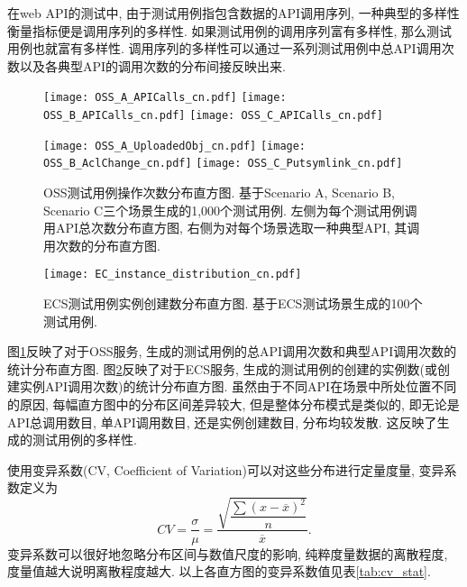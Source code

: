             在web API的测试中, 由于测试用例指包含数据的API调用序列, 一种典型的多样性衡量指标便是调用序列的多样性. 如果测试用例的调用序列富有多样性, 那么测试用例也就富有多样性. 调用序列的多样性可以通过一系列测试用例中总API调用次数以及各典型API的调用次数的分布间接反映出来.
            
            \begin{figure}[!htb]
                \begin{minipage}{0.5\textwidth}
                    \centering
                    \texttt{[image: OSS\_A\_APICalls\_cn.pdf]}
                    \texttt{[image: OSS\_B\_APICalls\_cn.pdf]}
                    \texttt{[image: OSS\_C\_APICalls\_cn.pdf]}
                \end{minipage}
                \begin{minipage}{0.5\textwidth}
                    \centering
                    \texttt{[image: OSS\_A\_UploadedObj\_cn.pdf]}
                    \texttt{[image: OSS\_B\_AclChange\_cn.pdf]}
                    \texttt{[image: OSS\_C\_Putsymlink\_cn.pdf]}
                \end{minipage}
                \caption{OSS测试用例操作次数分布直方图. 基于Scenario A, Scenario B, Scenario C三个场景生成的1,000个测试用例. 左侧为每个测试用例调用API总次数分布直方图, 右侧为对每个场景选取一种典型API, 其调用次数的分布直方图.}
                \label{fig:OSS_stat}
            \end{figure}
            
            \begin{figure}[!htb]
                \centering
                \texttt{[image: EC\_instance\_distribution\_cn.pdf]}
                \caption{ECS测试用例实例创建数分布直方图. 基于ECS测试场景生成的100个测试用例.}
                \label{fig:ECS_stat}
            \end{figure}
            
            图\ref{fig:OSS_stat}反映了对于OSS服务, 生成的测试用例的总API调用次数和典型API调用次数的统计分布直方图. 图\ref{fig:ECS_stat}反映了对于ECS服务, 生成的测试用例的创建的实例数(或创建实例API调用次数)的统计分布直方图. 虽然由于不同API在场景中所处位置不同的原因, 每幅直方图中的分布区间差异较大, 但是整体分布模式是类似的, 即无论是API总调用数目, 单API调用数目, 还是实例创建数目, 分布均较发散. 这反映了生成的测试用例的多样性.
            
            使用变异系数(CV, Coefficient of Variation)可以对这些分布进行定量度量, 变异系数定义为
            \begin{equation}
                CV = \dfrac{\sigma}{\mu} = \dfrac{\sqrt{\dfrac{\sum (x - \overline{x})^2}{n}}}{\overline{x}}.
            \end{equation}
            变异系数可以很好地忽略分布区间与数值尺度的影响, 纯粹度量数据的离散程度, 度量值越大说明离散程度越大. 以上各直方图的变异系数值见表\ref{tab:cv_stat}.
            

